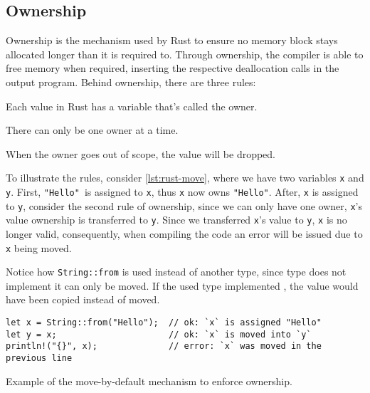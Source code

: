 \subsection{Ownership}\label{sec:rust-lang:ownership}

Ownership is the mechanism used by Rust to ensure no memory block stays allocated longer than it is required to.
Through ownership, the compiler is able to free memory when required,
inserting the respective deallocation calls in the output program.
Behind ownership, there are three rules:

\begin{displayquote}
    \begin{compactitem}
        \item Each value in Rust has a variable that’s called the owner.
        \item There can only be one owner at a time.
        \item When the owner goes out of scope, the value will be dropped.
    \end{compactitem}
\end{displayquote}

To illustrate the rules, consider \autoref{lst:rust-move}, where we have two variables \texttt{x} and \texttt{y}.
First, \texttt{"Hello"}\footnotemark~is assigned to \texttt{x}, thus \texttt{x} now owns \texttt{"Hello"}.
After, \texttt{x} is assigned to \texttt{y}, consider the second rule of ownership, since we can only have one owner,
\texttt{x}'s value ownership is transferred to \texttt{y}.
Since we transferred \texttt{x}'s value to \texttt{y}, \texttt{x} is no longer valid, consequently,
when compiling the code an error will be issued due to \texttt{x} being moved.

Notice how \texttt{String::from} is used instead of another type,
since  type does not implement  it can only be moved.
If the used type implemented , the value would have been copied instead of moved.

\begin{listing}
    \begin{verbatim}
let x = String::from("Hello");  // ok: `x` is assigned "Hello"
let y = x;                      // ok: `x` is moved into `y`
println!("{}", x);              // error: `x` was moved in the previous line
    \end{verbatim}
    \caption{Example of the move-by-default mechanism to enforce ownership.}
    \label{lst:rust-move}
\end{listing}

